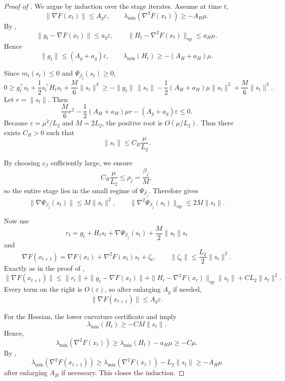 \documentclass{article}
\theoremstyle{plain}
\theoremstyle{definition}
\theoremstyle{remark}
\begin{document}
\begin{proof}[Proof of ]
We argue by induction over the stage iterates. Assume at time \(t\),
\[
\|\nabla F(x_t)\|\le A_g\varepsilon,
\qquad
\lambda_{\min}(\nabla^2F(x_t))\ge -A_H\mu.
\]
By ,
\[
\|g_t-\nabla F(x_t)\|\le a_g\varepsilon,
\qquad
\|H_t-\nabla^2F(x_t)\|_{\mathrm{op}}\le a_H\mu.
\]
Hence
\[
\|g_t\|\le (A_g+a_g)\varepsilon,
\qquad
\lambda_{\min}(H_t)\ge -(A_H+a_H)\mu.
\]

Since \(m_t(s_t)\le 0\) and \(\Psi_{\beta_j}(s_t)\ge 0\),
\[
0
\ge
g_t^\top s_t+\frac12 s_t^\top H_t s_t+\frac M6\|s_t\|^3
\ge
-\|g_t\|\,\|s_t\|-\frac12 (A_H+a_H)\mu \|s_t\|^2+\frac M6\|s_t\|^3.
\]
Let \(r=\|s_t\|\). Then
\[
\frac M6 r^2-\frac12 (A_H+a_H)\mu r-(A_g+a_g)\varepsilon \le 0.
\]
Because \(\varepsilon=\mu^2/L_2\) and \(M=2L_2\), the positive root is \(O(\mu/L_2)\). Thus there exists \(C_R>0\) such that
\[
\|s_t\|\le C_R \frac{\mu}{L_2}.
\]

By choosing \(c_\beta\) sufficiently large, we ensure
\[
C_R\frac{\mu}{L_2}\le \rho_j=\frac{\beta_j}{M},
\]
so the entire stage lies in the small regime of \(\Psi_{\beta_j}\). Therefore  gives
\[
\|\nabla\Psi_{\beta_j}(s_t)\|\le M\|s_t\|^2,
\qquad
\|\nabla^2\Psi_{\beta_j}(s_t)\|_{\mathrm{op}}\le 2M\|s_t\|.
\]

Now use
\[
r_t=g_t+H_t s_t+\nabla\Psi_{\beta_j}(s_t)+\frac M2\|s_t\|s_t
\]
and
\[
\nabla F(x_{t+1})
=
\nabla F(x_t)+\nabla^2F(x_t)s_t+\zeta_t,
\qquad
\|\zeta_t\|\le \frac{L_2}{2}\|s_t\|^2.
\]
Exactly as in the proof of ,
\[
\|\nabla F(x_{t+1})\|
\le
\|r_t\|+\|g_t-\nabla F(x_t)\|+\|H_t-\nabla^2F(x_t)\|_{\mathrm{op}}\|s_t\|+C L_2\|s_t\|^2.
\]
Every term on the right is \(O(\varepsilon)\), so after enlarging \(A_g\) if needed,
\[
\|\nabla F(x_{t+1})\|\le A_g\varepsilon.
\]

For the Hessian, the lower curvature certificate and  imply
\[
\lambda_{\min}(H_t)\ge -C M\|s_t\|.
\]
Hence,
\[
\lambda_{\min}(\nabla^2F(x_t))
\ge
\lambda_{\min}(H_t)-a_H\mu
\ge -C\mu.
\]
By ,
\[
\lambda_{\min}(\nabla^2F(x_{t+1}))
\ge
\lambda_{\min}(\nabla^2F(x_t))-L_2\|s_t\|
\ge -A_H\mu
\]
after enlarging \(A_H\) if necessary. This closes the induction.
\end{proof}


% 


% 
\end{document}
